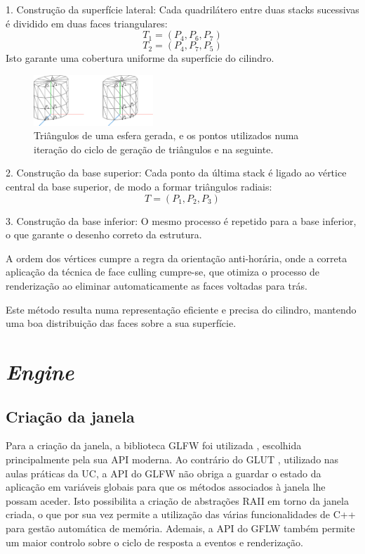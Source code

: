 \documentclass[12pt, a4paper]{article}
\begin{document}
1. Construção da superfície lateral:
Cada quadrilátero entre duas stacks sucessivas é dividido em duas faces triangulares:
\[
T_1 = (P_4, P_6, P_7)
\]
\[
T_2 = (P_4, P_7, P_5)
\]
Isto garante uma cobertura uniforme da superfície do cilindro.

\begin{figure}[H]
    \centering
    \includegraphics[width=0.4\textwidth]{res/figures/cylinder.pdf}
    \caption{
        Triângulos de uma esfera gerada, e os pontos utilizados numa iteração do ciclo de geração
        de triângulos e na seguinte.
    }
\end{figure}

2. Construção da base superior:
Cada ponto da última stack é ligado ao vértice central da base superior, de modo a formar
triângulos radiais:
\[
T = (P_1, P_2, P_3)
\]

3. Construção da base inferior:
O mesmo processo é repetido para a base inferior, o que garante o desenho correto da estrutura.

A ordem dos vértices cumpre a regra da orientação anti-horária, onde a correta
aplicação da técnica de face culling cumpre-se, que otimiza o processo de renderização
ao eliminar automaticamente as faces voltadas para trás.

Este método resulta numa representação eficiente e precisa do cilindro, mantendo uma boa
distribuição das faces sobre a sua superfície.

\section{\emph{Engine}}

\subsection{Criação da janela}

Para a criação da janela, a biblioteca GLFW foi utilizada \cite{glfw}, escolhida principalmente pela
sua API moderna. Ao contrário do GLUT \cite{glut}, utilizado nas aulas práticas da UC, a API do GLFW
não obriga a guardar o estado da aplicação em variáveis globais para que os métodos associados à
janela lhe possam aceder. Isto possibilita a criação de abstrações RAII em torno da janela criada, o
que por sua vez permite a utilização das várias funcionalidades de C++ para gestão automática de
memória. Ademais, a API do GFLW também permite um maior controlo sobre o ciclo de resposta a eventos
e renderização.
\end{document}
